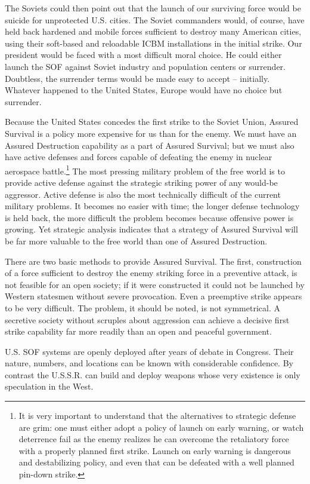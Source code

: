 The Soviets could then point out that the launch of our surviving force would be suicide for unprotected U.S. cities. The Soviet commanders would, of course, have held back hardened and mobile forces sufficient to destroy many American cities, using their soft-based and reloadable ICBM installations in the initial strike. Our president would be faced with a most difficult moral choice. He could either launch the SOF against Soviet industry and population centers or surrender. Doubtless, the surrender terms would be made easy to accept -- initially. Whatever happened to the United States, Europe would have no choice but surrender.

Because the United States concedes the first strike to the Soviet Union, Assured Survival is a policy more expensive for us than for the enemy. We must have an Assured Destruction capability as a part of Assured Survival; but we must also have active defenses and forces capable of defeating the enemy in nuclear aerospace battle.\footnote{It is very important to understand that the alternatives to strategic defense are grim: one must either adopt a policy of launch on early warning, or watch deterrence fail as the enemy realizes he can overcome the retaliatory force with a properly planned first strike. Launch on early warning is dangerous and destabilizing policy, and even that can be defeated with a well planned pin-down strike.} The most pressing military problem of the free world is to provide active defense against the strategic striking power of any would-be aggressor. Active defense is also the most technically difficult of the current military problems. It becomes no easier with time; the longer defense technology is held back, the more difficult the problem becomes because offensive power is growing. Yet strategic analysis indicates that a strategy of Assured Survival will be far more valuable to the free world than one of Assured Destruction.

There are two basic methods to provide Assured Survival. The first, construction of a force sufficient to destroy the enemy striking force in a preventive attack, is not feasible for an open society; if it were constructed it could not be launched by Western statesmen without severe provocation. Even a preemptive strike appears to be very difficult. The problem, it should be noted, is not symmetrical. A secretive society without scruples about aggression can achieve a decisive first strike capability far more readily than an open and peaceful government.

U.S. SOF systems are openly deployed after years of debate in Congress. Their nature, numbers, and locations can be known with considerable confidence. By contrast the U.S.S.R. can build and deploy weapons whose very existence is only speculation in the West.


